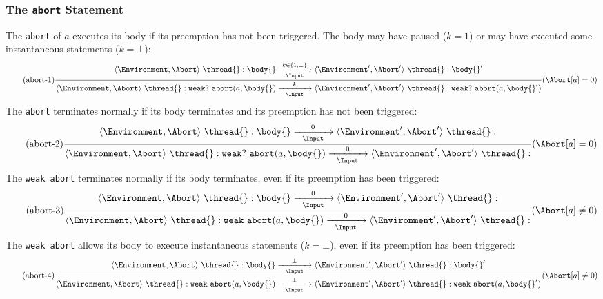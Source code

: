 \subsubsection{The \texttt{abort} Statement}
The \verb$abort$ of $a$ executes its body \body{} if its preemption 
has not been triggered. The body may have paused ($k = 1$) or may have executed
some instantaneous statements ($k = \bot$):
\begin{equation*}
	\tag{abort-1}
	\label{forec:abort-1}
	\frac{
			\langle \Environment, \Abort \rangle ~ \thread{}:\body{}
				\xrightarrow[~~\Input~~]{k \in \lbrace 1, \bot \rbrace} 
			\langle \Environment', \Abort' \rangle ~ \thread{}:\body{}'			
		}{
			\langle \Environment, \Abort \rangle ~ \thread{}:\mathtt{weak}?~\mathtt{abort}(a, \body{})
				\xrightarrow[~~\Input~~]{k} 
			\langle \Environment', \Abort' \rangle ~ \thread{}:\mathtt{weak}?~\mathtt{abort}(a, \body{}')
		}
	(\Abort[a] = 0)
\end{equation*}
The \verb$abort$ terminates normally if its body terminates and its preemption has not
been triggered:
\begin{equation*}
	\tag{abort-2}
	\label{forec:abort-2}
	\frac{
			\langle \Environment, \Abort \rangle ~ \thread{}:\body{}
				\xrightarrow[~~\Input~~]{0} 
			\langle \Environment', \Abort' \rangle ~ \thread{}:
		}{
			\langle \Environment, \Abort \rangle ~ \thread{}:\mathtt{weak}?~\mathtt{abort}(a, \body{})
				\xrightarrow[~~\Input~~]{0} 
			\langle \Environment', \Abort' \rangle ~ \thread{}:
		}
	(\Abort[a] = 0)
\end{equation*}
The \verb$weak abort$ terminates normally if its 
body terminates, even if its preemption has been triggered:
\begin{equation*}
	\tag{abort-3}
	\label{forec:abort-3}
	\frac{
			\langle \Environment, \Abort \rangle ~ \thread{}:\body{}
				\xrightarrow[~~\Input~~]{0} 
			\langle \Environment', \Abort' \rangle ~ \thread{}:
		}{
			\langle \Environment, \Abort \rangle ~ \thread{}:\mathtt{weak}~\mathtt{abort}(a, \body{})
				\xrightarrow[~~\Input~~]{0} 
			\langle \Environment', \Abort' \rangle ~ \thread{}:
		}
	(\Abort[a] \neq 0)
\end{equation*}
The \verb$weak abort$ allows its body to execute instantaneous statements ($k = \bot$), 
even if its preemption has been triggered:
\begin{equation*}
	\tag{abort-4}
	\label{forec:abort-4}
	\frac{
			\langle \Environment, \Abort \rangle ~ \thread{}:\body{}
				\xrightarrow[~~\Input~~]{\bot} 
			\langle \Environment', \Abort' \rangle ~ \thread{}:\body{}'
		}{
			\langle \Environment, \Abort \rangle ~ \thread{}:\mathtt{weak}~\mathtt{abort}(a, \body{})
				\xrightarrow[~~\Input~~]{\bot} 
			\langle \Environment', \Abort' \rangle ~ \thread{}:\mathtt{weak}~\mathtt{abort}(a, \body{}')
		}
	(\Abort[a] \neq 0)
\end{equation*}
